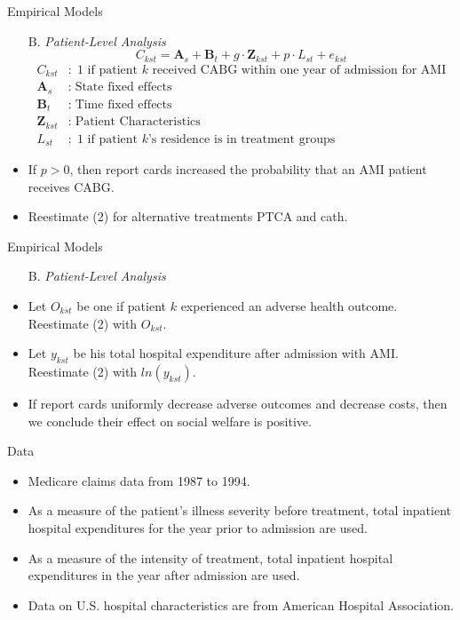 \documentclass[10pt]{beamer}
\begin{document}
\begin{frame}{Empirical Models}
\begin{itemize}
\item[B.] \textit{Patient-Level Analysis}
\begin{equation}
C_{k s t}=\mathbf{A}_s+\mathbf{B}_t+g \cdot \mathbf{Z}_{k s t}+p \cdot L_{s t}+e_{k s t}
\end{equation}
             \begin{align*}
                C_{kst}&: \; \text{1 if patient $k$ received CABG within one year of admission for AMI}\\
                \mathbf{A}_s&: \; \text{State fixed effects}\\
                \mathbf{B}_t&: \; \text{Time fixed effects}\\
                \mathbf{Z}_{kst}&: \; \text{Patient Characteristics}\\
                L_{st}&: \; \text{1 if patient $k$'s residence is in treatment groups}
            \end{align*}
\item If $p>0$, then report cards increased the probability that an AMI patient receives CABG.
\item Reestimate (2) for alternative treatments PTCA and cath.
\end{itemize}

\end{frame}

\begin{frame}{Empirical Models}
\begin{itemize}
\item[B.] \textit{Patient-Level Analysis}
\item Let $O_{kst}$ be one if patient $k$ experienced an adverse health outcome. Reestimate (2) with $O_{kst}$.
\item  Let $y_{kst}$ be his total hospital expenditure after admission with AMI. Reestimate (2) with $ln(y_{kst})$.
\item If report cards uniformly decrease adverse outcomes and decrease costs, then we conclude their effect on social welfare is positive.
\end{itemize}

\end{frame}

\begin{frame}{Data}
\begin{itemize}
\item Medicare claims data from 1987 to 1994.
\item As a measure of the patient's illness severity before treatment, total inpatient hospital expenditures for the year prior to admission are used.
\item As a measure of the intensity of treatment, total inpatient hospital expenditures in the year after admission are used.
\item Data on U.S. hospital characteristics are from American Hospital Association. 
\end{itemize}

\end{frame}
\end{document}
